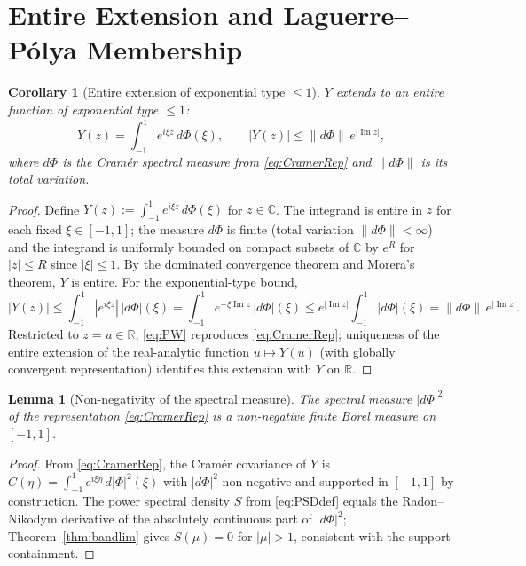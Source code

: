 \documentclass[11pt]{article}
\newtheorem{lemma}{Lemma}
\newtheorem{corollary}{Corollary}
\DeclareMathOperator{\ImOp}{Im}
\let\Im\ImOp
\begin{document}
\section{Entire Extension and Laguerre--P\'olya Membership}

\begin{corollary}[Entire extension of exponential type $\le 1$]\label{cor:PW}
$Y$ extends to an entire function of exponential type $\le 1$:
\begin{equation}\label{eq:PW}
Y(z)=\int_{-1}^{1}e^{i\xi z}\,d\Phi(\xi),\qquad |Y(z)|\le\|d\Phi\|\,e^{|\Im z|},
\end{equation}
where $d\Phi$ is the Cram\'er spectral measure from \eqref{eq:CramerRep} and $\|d\Phi\|$ is its total variation.
\end{corollary}

\begin{proof}
Define $Y(z):=\int_{-1}^{1}e^{i\xi z}\,d\Phi(\xi)$ for $z\in\mathbb{C}$. The integrand is entire in $z$ for each fixed $\xi\in[-1,1]$; the measure $d\Phi$ is finite (total variation $\|d\Phi\|<\infty$) and the integrand is uniformly bounded on compact subsets of $\mathbb{C}$ by $e^{R}$ for $|z|\le R$ since $|\xi|\le 1$. By the dominated convergence theorem and Morera's theorem, $Y$ is entire. For the exponential-type bound,
\begin{equation}\label{eq:PWbound}
|Y(z)|\le\int_{-1}^{1}|e^{i\xi z}|\,|d\Phi|(\xi)=\int_{-1}^{1}e^{-\xi\Im z}\,|d\Phi|(\xi)\le e^{|\Im z|}\int_{-1}^{1}|d\Phi|(\xi)=\|d\Phi\|\,e^{|\Im z|}.
\end{equation}
Restricted to $z=u\in\mathbb{R}$, \eqref{eq:PW} reproduces \eqref{eq:CramerRep}; uniqueness of the entire extension of the real-analytic function $u\mapsto Y(u)$ (with globally convergent representation) identifies this extension with $Y$ on $\mathbb{R}$.
\end{proof}

\begin{lemma}[Non-negativity of the spectral measure]\label{lem:PSD}
The spectral measure $|d\Phi|^2$ of the representation \eqref{eq:CramerRep} is a non-negative finite Borel measure on $[-1,1]$.
\end{lemma}

\begin{proof}
From \eqref{eq:CramerRep}, the Cram\'er covariance of $Y$ is $C(\eta)=\int_{-1}^{1}e^{i\xi\eta}\,d|\Phi|^2(\xi)$ with $|d\Phi|^2$ non-negative and supported in $[-1,1]$ by construction. The power spectral density $S$ from \eqref{eq:PSDdef} equals the Radon--Nikodym derivative of the absolutely continuous part of $|d\Phi|^2$; Theorem~\ref{thm:bandlim} gives $S(\mu)=0$ for $|\mu|>1$, consistent with the support containment.
\end{proof}
\end{document}
